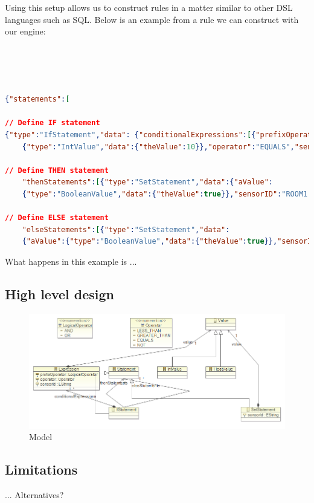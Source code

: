 Using this setup allows us to construct rules in a matter similar to other DSL languages such as SQL. Below is an example from a rule we can construct with our engine:
\\
\\
\\
\\
\\
\begin{lstlisting}[language=json,firstnumber=1]
{"statements":[

// Define IF statement
{"type":"IfStatement","data": {"conditionalExpressions":[{"prefixOperator":"AND","aValue":
	{"type":"IntValue","data":{"theValue":10}},"operator":"EQUALS","sensorId":"ROOM1.TEMPERATURE"}],

// Define THEN statement	
	"thenStatements":[{"type":"SetStatement","data":{"aValue":
	{"type":"BooleanValue","data":{"theValue":true}},"sensorID":"ROOM1.HEATER"}}],

// Define ELSE statement
	"elseStatements":[{"type":"SetStatement","data":
	{"aValue":{"type":"BooleanValue","data":{"theValue":true}},"sensorID":"ROOM1.BLINDS"}}]}}]}
\end{lstlisting}

What happens in this example is ...

\subsection{High level design}

\begin{figure}[t]
\includegraphics[width=1.00\columnwidth]{model.png}
\caption{Model}
\end{figure}


\subsection{Limitations}
... Alternatives?